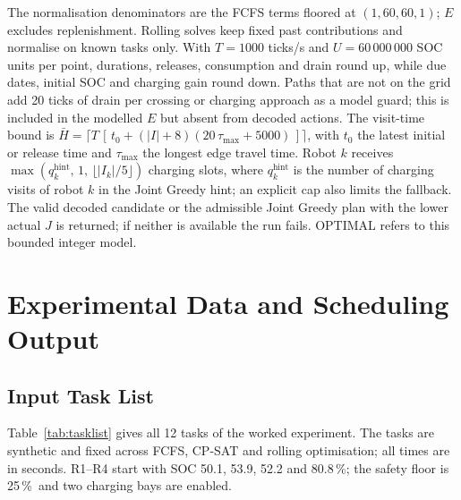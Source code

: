 \documentclass[11pt,a4paper]{article}
\newcommand{\pct}{\,\%}
\begin{document}
The normalisation denominators are the FCFS terms floored at $(1, 60, 60, 1)$; $E$ excludes
replenishment. Rolling solves keep fixed past contributions and normalise on known tasks only. With
$T = 1000$ ticks/s and $U = 60\,000\,000$ SOC units per point, durations, releases, consumption and
drain round up, while due dates, initial SOC and charging gain round down. Paths that are not on the
grid add 20 ticks of drain per crossing or charging approach as a model guard; this is included in the
modelled $E$ but absent from decoded actions. The visit-time bound is
$\bar H = \lceil T\,[\,t_0 + (|I| + 8)(20\,\tau_{\max} + 5000)\,] \rceil$, with $t_0$ the latest
initial or release time and $\tau_{\max}$ the longest edge travel time. Robot $k$ receives $\max(q_k^{\text{hint}},\, 1,\, \lfloor |I_k|/5 \rfloor)$
charging slots, where $q_k^{\text{hint}}$ is the number of charging visits of robot $k$ in the Joint
Greedy hint; an explicit cap also limits the fallback. The valid decoded candidate or the
admissible Joint Greedy plan with the lower actual $J$ is returned; if neither is available the run
fails. OPTIMAL refers to this bounded integer model.

\section{Experimental Data and Scheduling Output}
\label{app:data}

\subsection{Input Task List}

Table~\ref{tab:tasklist} gives all 12 tasks of the worked experiment. The tasks are synthetic and fixed
across FCFS, CP-SAT and rolling optimisation; all times are in seconds. R1--R4 start with SOC 50.1,
53.9, 52.2 and 80.8\pct; the safety floor is 25\pct\ and two charging bays are enabled.
\end{document}
